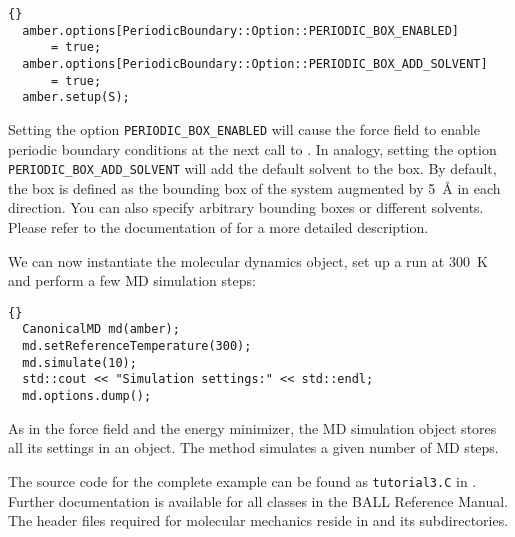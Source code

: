 \begin{lstlisting}{}
  amber.options[PeriodicBoundary::Option::PERIODIC_BOX_ENABLED] 
      = true;
  amber.options[PeriodicBoundary::Option::PERIODIC_BOX_ADD_SOLVENT] 
      = true;
  amber.setup(S);
\end{lstlisting}

\noindent
Setting the option {\tt PERIODIC\_BOX\_ENABLED} will cause the force field to
enable periodic boundary conditions at the next call to . In
analogy, setting the option {\tt PERIODIC\_BOX\_ADD\_SOLVENT} will add the 
default solvent to the box. By default, the box is defined as the bounding box
of the system augmented by 5~\AA{} in each direction. You can also specify 
arbitrary bounding boxes or different solvents. Please refer to the 
documentation of  for a more detailed description.

We can now instantiate the molecular dynamics object, set up a run at 300~K and
perform a few  MD simulation steps:

\begin{lstlisting}{}
  CanonicalMD md(amber);
  md.setReferenceTemperature(300);
  md.simulate(10);
  std::cout << "Simulation settings:" << std::endl;
  md.options.dump();
\end{lstlisting}

\noindent
As in the force field and the energy minimizer, the MD simulation object
stores all its settings in an  object. The
 method simulates a given number of MD
steps. 

The source code for the complete example can be found as {\tt tutorial3.C}
in . Further documentation is available for all
classes in the BALL Reference Manual. The header files required for molecular
mechanics reside in  and its
subdirectories.

